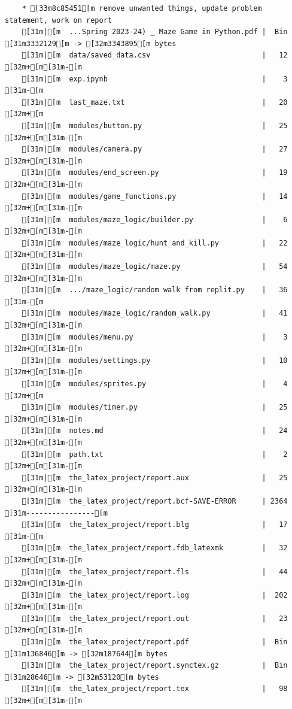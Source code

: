 \documentclass{article}
\begin{document}
{\begin{verbatim}
    * [33m8c85451[m remove unwanted things, update problem statement, work on report
    [31m|[m  ...Spring 2023-24) _ Maze Game in Python.pdf |  Bin [31m3332129[m -> [32m3343895[m bytes
    [31m|[m  data/saved_data.csv                          |   12 [32m+[m[31m-[m
    [31m|[m  exp.ipynb                                    |    3 [31m-[m
    [31m|[m  last_maze.txt                                |   20 [32m+[m
    [31m|[m  modules/button.py                            |   25 [32m+[m[31m-[m
    [31m|[m  modules/camera.py                            |   27 [32m+[m[31m-[m
    [31m|[m  modules/end_screen.py                        |   19 [32m+[m[31m-[m
    [31m|[m  modules/game_functions.py                    |   14 [32m+[m[31m-[m
    [31m|[m  modules/maze_logic/builder.py                |    6 [32m+[m[31m-[m
    [31m|[m  modules/maze_logic/hunt_and_kill.py          |   22 [32m+[m[31m-[m
    [31m|[m  modules/maze_logic/maze.py                   |   54 [32m+[m[31m-[m
    [31m|[m  .../maze_logic/random walk from replit.py    |   36 [31m-[m
    [31m|[m  modules/maze_logic/random_walk.py            |   41 [32m+[m[31m-[m
    [31m|[m  modules/menu.py                              |    3 [32m+[m[31m-[m
    [31m|[m  modules/settings.py                          |   10 [32m+[m[31m-[m
    [31m|[m  modules/sprites.py                           |    4 [32m+[m
    [31m|[m  modules/timer.py                             |   25 [32m+[m[31m-[m
    [31m|[m  notes.md                                     |   24 [32m+[m[31m-[m
    [31m|[m  path.txt                                     |    2 [32m+[m[31m-[m
    [31m|[m  the_latex_project/report.aux                 |   25 [32m+[m[31m-[m
    [31m|[m  the_latex_project/report.bcf-SAVE-ERROR      | 2364 [31m----------------[m
    [31m|[m  the_latex_project/report.blg                 |   17 [31m-[m
    [31m|[m  the_latex_project/report.fdb_latexmk         |   32 [32m+[m[31m-[m
    [31m|[m  the_latex_project/report.fls                 |   44 [32m+[m[31m-[m
    [31m|[m  the_latex_project/report.log                 |  202 [32m+[m[31m-[m
    [31m|[m  the_latex_project/report.out                 |   23 [32m+[m[31m-[m
    [31m|[m  the_latex_project/report.pdf                 |  Bin [31m136846[m -> [32m187644[m bytes
    [31m|[m  the_latex_project/report.synctex.gz          |  Bin [31m28646[m -> [32m53120[m bytes
    [31m|[m  the_latex_project/report.tex                 |   98 [32m+[m[31m-[m

\end{verbatim}}
\end{document}
